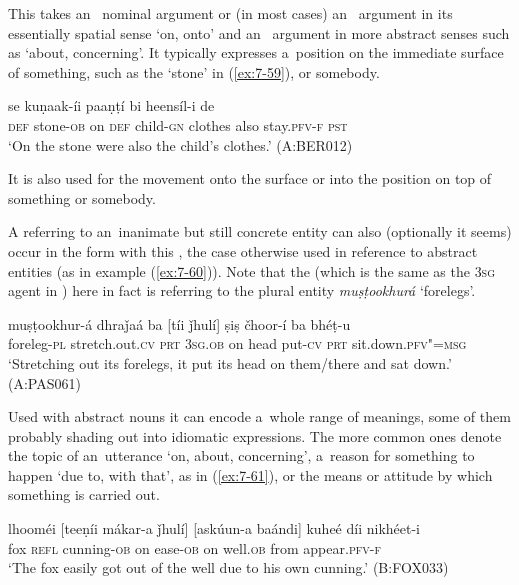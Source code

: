  This  takes an~ nominal argument or (in most cases) an~  argument in its essentially spatial sense `on, onto' and an~  argument in more abstract senses such as `about, concerning'. It typically expresses a~position on the immediate surface of something, such as the `stone' in (\ref{ex:7-59}), or somebody.

\begin{exe}
\ex
\label{ex:7-59}
 se kuṇaak-íi paaṇṭí bi heensíl-i de \\
\textsc{def} stone-\textsc{ob} on \textsc{def}  child-\textsc{gn}  clothes also  stay.\textsc{pfv-f} \textsc{pst } \\
\glt `On the stone were also the child's clothes.' (A:BER012)
\end{exe}

It is also used for the movement onto the surface or into the position on top of something or somebody.


A  referring to an~inanimate but still concrete entity can also (optionally it seems) occur in the  form with this , the case otherwise used in  reference to abstract entities (as in example (\ref{ex:7-60})). Note that the   (which is the same as the \textsc{3sg} agent in ) here in fact is referring to the plural entity \textit{muṣṭookhurá} `forelegs'.

\begin{exe}
\ex
\label{ex:7-60}
\gll muṣṭookhur-á dhraǰaá ba [tíi ǰhulí] ṣiṣ čhoor-í ba bhéṭ-u\\
foreleg-\textsc{pl} stretch.out.\textsc{cv} \textsc{prt} \textsc{3sg.ob} on head put-\textsc{cv} \textsc{prt} sit.down.\textsc{pfv"=msg}\\
\glt `Stretching out its forelegs, it put its head on them/there and sat down.' (A:PAS061)
\end{exe}

Used with abstract nouns it can encode a~whole range of meanings, some of them probably shading out into idiomatic expressions. The more common ones denote the topic of an~utterance `on, about, concerning', a~reason for something to happen `due to, with that', as in (\ref{ex:7-61}), or the means or attitude by which something is carried out.

\begin{exe}
\ex
\label{ex:7-61}
\gll lhooméi [teeṇíi mákar-a ǰhulí] [askúun-a baándi] kuheé díi nikhéet-i\\
fox \textsc{refl} cunning-\textsc{ob} on ease-\textsc{ob}  on well.\textsc{ob} from appear.\textsc{pfv-f} \\
\glt `The fox easily got out of the well due to his own cunning.' (B:FOX033)
\end{exe}

